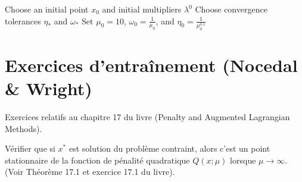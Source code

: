 \begin{algorithm}[H]
    \caption{Bound-constrained Lagrangian method}
    \SetAlgoLined
    Choose an initial point $x_0$ and initial multipliers $\lambda^0$\;
    Choose convergence tolerances $\eta_*$ and $\omega_*$\;
    Set $\mu_0=10$, $\omega_0=\frac{1}{\mu_0}$, and $\eta_0=\frac{1}{\mu_0^{0.1}}$\;
\end{algorithm}



\section{Exercices d'entraînement (Nocedal \& Wright)}
\label{sec:12.exercises}

Exercices relatifs au chapitre 17 du livre (Penalty and Augmented Lagrangian Methods).

\bigskip
\begin{exercice}
Vérifier que si $x^*$ est solution du problème contraint, alors c'est un point stationnaire de la fonction de pénalité quadratique $Q(x; \mu)$ lorsque $\mu \to \infty$. 
(Voir Théorème 17.1 et exercice 17.1 du livre).
\end{exercice}

